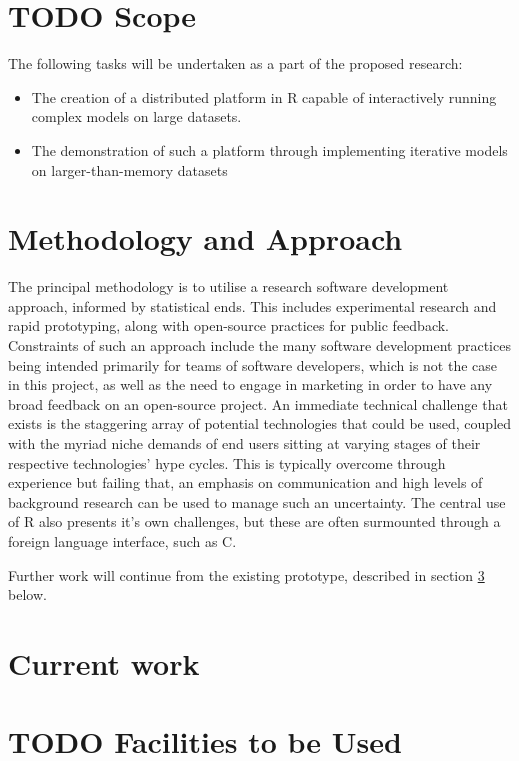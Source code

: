 \documentclass[a4paper,10pt]{article}
\begin{document}
\section{TODO Scope}
The following tasks will be undertaken as a part of the proposed research:

\begin{itemize}
	\item The creation of a distributed platform in R capable of
		interactively running complex models on large datasets.
	\item The demonstration of such a platform through implementing
		iterative models on larger-than-memory datasets
\end{itemize}

\section{Methodology and Approach}

The principal methodology is to utilise a research software development approach, informed by statistical ends.
This includes experimental research and rapid prototyping, along with open-source practices for public feedback.
Constraints of such an approach include the many software development practices being intended primarily for teams of software developers, which is not the case in this project, as well as the need to engage in marketing in order to have any broad feedback on an open-source project.
An immediate technical challenge that exists is the staggering array of potential technologies that could be used, coupled with the myriad niche demands of end users sitting at varying stages of their respective technologies' hype cycles.
This is typically overcome through experience but failing that, an emphasis on communication and high levels of background research can be used to manage such an uncertainty.
The central use of R also presents it's own challenges, but these are often surmounted through a foreign language interface, such as C.

Further work will continue from the existing prototype, described in section \ref{curr} below.

\section{Current work}\label{curr}



\section{TODO Facilities to be Used}
\end{document}
